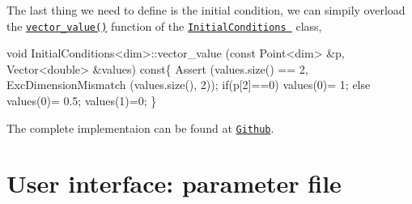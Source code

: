 The last thing we need to define is the initial condition, we can simpily overload the \href{../html/class_initial_conditions.html#aa10cfdd7350c3810a8deab707f397657}{\tt vector\-\_\-value()} function of the \href{../html/class_initial_conditions.html}{\tt Initial\-Conditions } class, 
\begin{DoxyCode}
\textcolor{keywordtype}{void} InitialConditions<dim>::vector_value (\textcolor{keyword}{const} Point<dim>   &p, Vector<double>   &values)\textcolor{keyword}{ const}\{
  Assert (values.size() == 2, ExcDimensionMismatch (values.size(), 2));
    \textcolor{keywordflow}{if}(p[2]==0) values(0)= 1;
  \textcolor{keywordflow}{else} values(0)= 0.5;
    values(1)=0;
\}
\end{DoxyCode}


The complete implementaion can be found at \href{https://github.com/mechanoChem/mechanoChemFEM/tree/example/Example4_growth}{\tt Github}. \hypertarget{growth_file}{}\section{User interface\-: parameter file}\label{growth_file}

